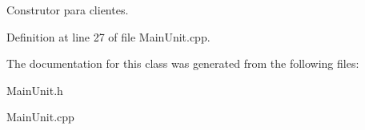 Construtor para clientes. 



Definition at line 27 of file Main\-Unit.\-cpp.



The documentation for this class was generated from the following files\-:\begin{DoxyCompactItemize}
\item 
Main\-Unit.\-h\item 
Main\-Unit.\-cpp\end{DoxyCompactItemize}
